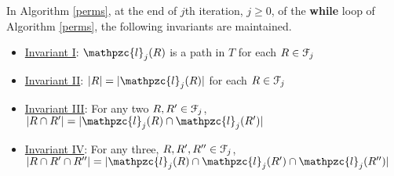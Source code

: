 \documentclass[a4paper,UKenglish,numberwithinsect]{lipics}
\def\cF{{\cal F}}
\def\cl{\mathpzc{l}}
\begin{document}
\begin{lemma} 
  \label{lem:invar1} In Algorithm \ref{perms}, at the end of $j$th
  iteration, $j \ge 0$, of the {\bf while} loop of Algorithm
  \ref{perms}, the following invariants are maintained.
\begin{itemize}
\item []\underline {Invariant I}: $\cl_j(R)$ is a path in $T$ for each $R \in \cF_j$
\item []\underline {Invariant II}: $|R| = |\cl_j(R)|$ for each $R \in \cF_j$
\item []\underline {Invariant III}: For any two $R, R' \in \cF_j$,
  $|R \cap R'| = |\cl_j(R) \cap \cl_j(R')|$
\item []\underline {Invariant IV}: For any three, $R, R', R'' \in \cF_j$,
  $|R \cap R' \cap R''|=|\cl_j(R) \cap \cl_j(R') \cap \cl_j(R'')|$
\end{itemize}
\end{lemma}
\end{document}
